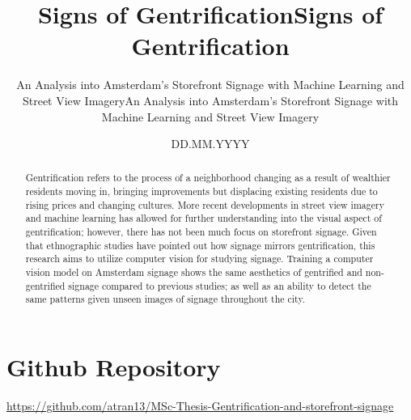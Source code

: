 \documentclass[ds, nofrontpicture, nofirstcompanypicture, nosecondcompanypicture]{mscthesis}
\title{Signs of Gentrification}
\subtitle{An Analysis into Amsterdam's Storefront Signage with Machine Learning and Street View Imagery}
\date{DD.MM.YYYY}
\begin{document}
\pagestyle{plain}
\setcounter{page}{1}

\maketitlepage
\fixemptypage

\title{Signs of Gentrification}
\subtitle{An Analysis into Amsterdam's Storefront Signage with Machine Learning and Street View Imagery}

\begin{abstract}
Gentrification refers to the process of a neighborhood changing as a result of wealthier residents moving in, bringing improvements but displacing existing residents due to rising prices and changing cultures. More recent developments in street view imagery and machine learning has allowed for further understanding into the visual aspect of gentrification; however, there has not been much focus on storefront signage. Given that ethnographic studies have pointed out how signage mirrors gentrification, this research aims to utilize computer vision for studying signage. Training a computer vision model on Amsterdam signage shows the same aesthetics of gentrified and non-gentrified signage compared to previous studies; as well as an ability to detect the same patterns given unseen images of signage throughout the city.
\end{abstract}

\maketitle

\section*{Github Repository}
\url{https://github.com/atran13/MSc-Thesis-Gentrification-and-storefront-signage}












\newpage

\end{document}
